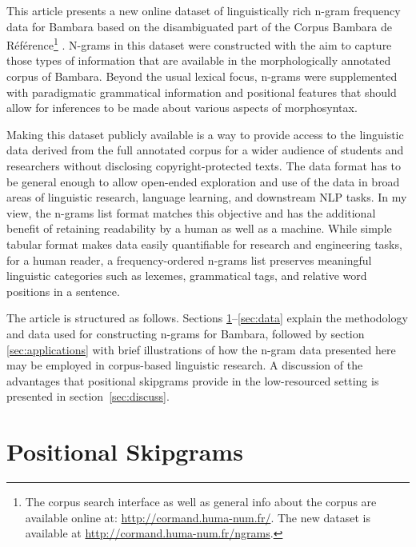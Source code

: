 \documentclass[12pt]{article}
\begin{document}

This article presents a new online dataset of linguistically rich
n-gram frequency data for Bambara based on the disambiguated part of
the Corpus Bambara de R\'ef\'erence\footnote{The corpus search
  interface as well as general info about the corpus are available
  online at: \url{http://cormand.huma-num.fr/}. The new dataset is
  available at \url{http://cormand.huma-num.fr/ngrams}.}
\autocite{vydrin2013bamana}. N-grams in this dataset were constructed
with the aim to capture those types of information that are available
in the morphologically annotated corpus of Bambara.  Beyond the usual
lexical focus, n-grams were supplemented with paradigmatic grammatical
information and positional features that should allow
for inferences to be made about various aspects of
morphosyntax. %

Making this dataset publicly available is a way to provide access to
the linguistic data derived from the full annotated corpus for a wider
audience of students and researchers without disclosing
copyright-protected texts. The data format has to be general enough to
allow open-ended exploration and use of the data in broad areas of
linguistic research, language learning, and downstream NLP tasks. In
my view, the n-grams list format matches this objective
and has the additional benefit of retaining readability by a human as
well as a machine. While simple tabular format makes data easily
quantifiable for research and engineering tasks, for a human reader, a
frequency-ordered n-grams list preserves meaningful linguistic
categories such as lexemes, grammatical tags, and relative word positions in
a sentence. %


The article is structured as follows. Sections
\ref{sec:definition}--\ref{sec:data} explain the methodology and data
used for constructing n-grams for Bambara, followed by section
\ref{sec:applications} with brief illustrations of how the n-gram data
presented here may be employed in corpus-based linguistic
research. A discussion of the advantages that positional skipgrams
provide in the low-resourced setting is presented in
section~\ref{sec:discuss}. 

\section{Positional Skipgrams}
\label{sec:definition}
\end{document}

